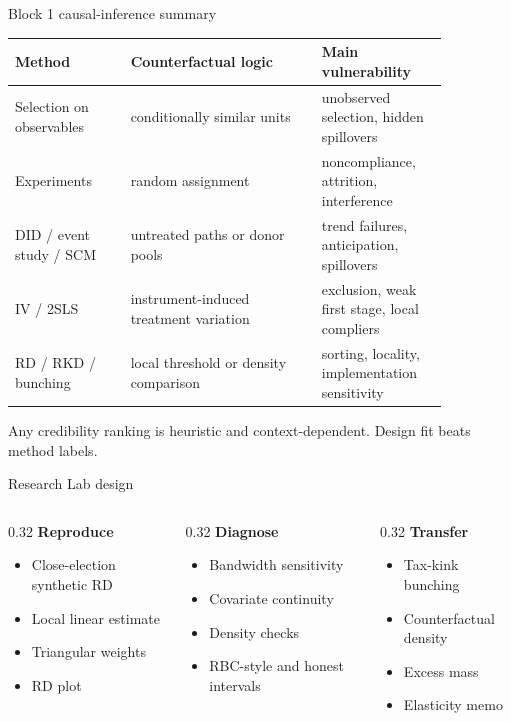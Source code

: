 \documentclass[aspectratio=169,11pt]{beamer}
\newcommand{\1}{\mathbf{1}}
\begin{document}
\begin{frame}{Block 1 causal-inference summary}
\small
\begin{tabular}{p{0.23\linewidth} p{0.38\linewidth} p{0.25\linewidth}}
\toprule
Method & Counterfactual logic & Main vulnerability \\
\midrule
Selection on observables & conditionally similar units & unobserved selection, hidden spillovers \\
Experiments & random assignment & noncompliance, attrition, interference \\
DID / event study / SCM & untreated paths or donor pools & trend failures, anticipation, spillovers \\
IV / 2SLS & instrument-induced treatment variation & exclusion, weak first stage, local compliers \\
RD / RKD / bunching & local threshold or density comparison & sorting, locality, implementation sensitivity \\
\bottomrule
\end{tabular}

\medskip
Any credibility ranking is heuristic and context-dependent. Design fit beats method labels.
\end{frame}

\begin{frame}{Research Lab design}
\begin{columns}[T,onlytextwidth]
\begin{column}{0.32\linewidth}
\textbf{Reproduce}
\begin{itemize}
    \item Close-election synthetic RD
    \item Local linear estimate
    \item Triangular weights
    \item RD plot
\end{itemize}
\end{column}
\begin{column}{0.32\linewidth}
\textbf{Diagnose}
\begin{itemize}
    \item Bandwidth sensitivity
    \item Covariate continuity
    \item Density checks
    \item RBC-style and honest intervals
\end{itemize}
\end{column}
\begin{column}{0.32\linewidth}
\textbf{Transfer}
\begin{itemize}
    \item Tax-kink bunching
    \item Counterfactual density
    \item Excess mass
    \item Elasticity memo
\end{itemize}
\end{column}
\end{columns}
\end{frame}
\end{document}
